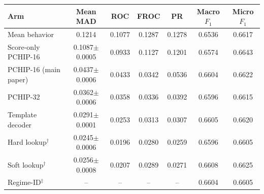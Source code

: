 \begin{tabular}{lcccccc}
\toprule
Arm & Mean MAD & ROC & FROC & PR & Macro $F_1$ & Micro $F_1$ \\
\midrule
Mean behavior & 0.1214 & 0.1077 & 0.1287 & 0.1278 & 0.6536 & 0.6617 \\
Score-only PCHIP-16 & 0.1087$\pm$0.0005 & 0.0933 & 0.1127 & 0.1201 & 0.6574 & 0.6643 \\
PCHIP-16 (main paper) & 0.0437$\pm$0.0006 & 0.0433 & 0.0342 & 0.0536 & 0.6604 & 0.6622 \\
PCHIP-32 & 0.0362$\pm$0.0006 & 0.0358 & 0.0336 & 0.0392 & 0.6596 & 0.6615 \\
Template decoder & 0.0291$\pm$0.0001 & 0.0253 & 0.0313 & 0.0307 & 0.6605 & 0.6620 \\
Hard lookup$^\dagger$ & 0.0245$\pm$0.0006 & 0.0196 & 0.0280 & 0.0259 & 0.6596 & 0.6605 \\
Soft lookup$^\dagger$ & 0.0256$\pm$0.0008 & 0.0207 & 0.0289 & 0.0271 & 0.6608 & 0.6625 \\
Regime-ID$^\ddagger$ & -- & -- & -- & -- & 0.6604 & 0.6605 \\
\bottomrule
\end{tabular}
